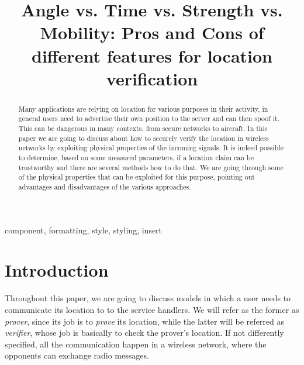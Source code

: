 \documentclass[conference]{IEEEtran}
\begin{document}
\title{Angle vs. Time vs. Strength vs. Mobility: Pros and Cons of different features for location verification}

\author{
    \and
    \and
}

\maketitle

\begin{abstract}
    Many applications are relying on location for various purposes in their activity, in general users need to advertise their own position to the server and can then spoof it. This can be dangerous in many contexts, from secure networks to aircraft. In this paper we are going to discuss about how to securely verify the location in wireless networks by exploiting physical properties of the incoming signals. It is indeed possible to determine, based on some measured parameters, if a location claim can be trustworthy and there are several methods how to do that. We are going through some of the physical properties that can be exploited for this purpose, pointing out advantages and disadvantages of the various approaches.
\end{abstract}

\begin{IEEEkeywords}
component, formatting, style, styling, insert
\end{IEEEkeywords}

\section{Introduction}
Throughout this paper, we are going to discuss models in which a user needs to communicate its location to to the service handlers. We will refer as the former as \emph{prover}, since its job is to \emph{prove} its location, while the latter will be referred as \emph{verifier}, whose job is basically to check the prover's location. If not differently specified, all the communication happen in a wireless network, where the opponents can exchange radio messages.
\end{document}
